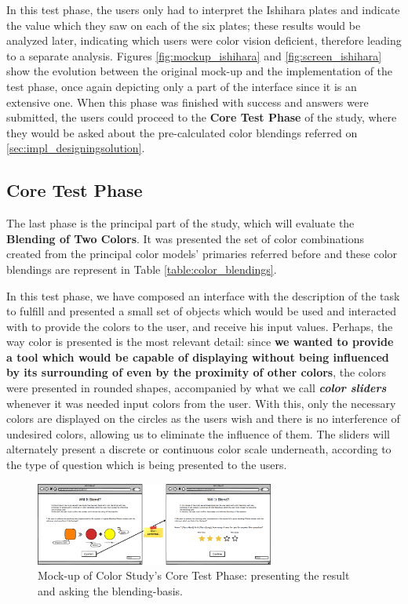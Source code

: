 %
In this test phase, the users only had to interpret the Ishihara plates and indicate the value which they saw on each of the six plates; these results would be
analyzed later, indicating which users were color vision deficient, therefore leading to a separate analysis. Figures \ref{fig:mockup_ishihara} and
\ref{fig:screen_ishihara} show the evolution between the original mock-up and the implementation of the test phase, once again depicting only a part of the
interface since it is an extensive one.
%
When this phase was finished with success and answers were submitted, the users could proceed to the \textbf{Core Test Phase} of the study, where they would be asked
about the pre-calculated color blendings referred on \ref{sec:impl_designingsolution}.
%
%
\subsection{Core Test Phase}
\label{subsec:design_core}
%
The last phase is the principal part of the study, which will evaluate the \textbf{Blending of Two Colors}. It was presented the set of color combinations
created from the principal color models' primaries referred before and these color blendings are represent in Table \ref{table:color_blendings}. \par
%
In this test phase, we have composed an interface with the description of the task to fulfill and presented a small set of objects which would be used and
interacted with to provide the colors to the user, and receive his input values. Perhaps, the way color is presented is the most relevant detail: since \textbf{we
wanted to provide a tool which would be capable of displaying without being influenced by its surrounding of even by the proximity of other colors}, the colors
were presented in rounded shapes, accompanied by what we call \emph{\textbf{color sliders}} whenever it was needed input colors from the user. With this,
only the necessary colors are displayed on the circles as the users wish and there is no interference of undesired colors, allowing us to eliminate the
influence of them. The sliders will alternately present a discrete or continuous color scale underneath, according to the type of question which is being
presented to the users. \par
%
\begin{figure}[htbp]
	\centering
  \includegraphics[width=0.7\textwidth]{images/implementation/mockup_core_objTwoColors.png}
  \caption[Mock-up of Color Study's Core Test Phase: present the result and ask the blending-basis.]{Mock-up of Color Study's Core
	Test Phase: presenting the result and asking the blending-basis.}
  \label{fig:mockup_core_1}
\end{figure} \par
